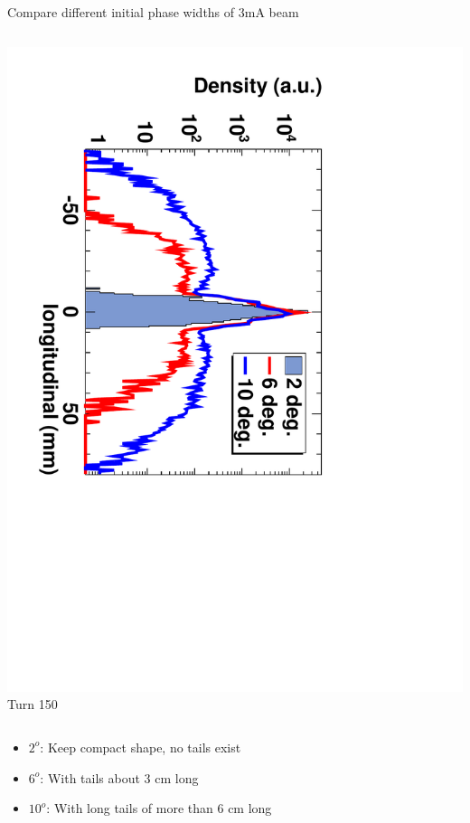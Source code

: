 \documentclass[xcolor=pdftex,table,10pt,yellow,mathserif]{beamer}
\begin{document}
{\begin{block}{Compare different initial phase widths of 3mA beam}
\begin{columns}
\begin{column}{3.0cm}
      \includegraphics[angle=90,width=\linewidth]{figures/Theta-Turn-150.pdf} \\
      \center Turn 150
    \end{column}
  \end{columns}
  \end{block}
  \begin{block}{}  
    \begin{itemize}
      \item $2^o$:  Keep compact shape, no tails exist
      \item $6^o$:  With tails about 3 cm long
      \item $10^o$: With long tails of more than 6 cm long
    \end{itemize}
  \end{block}

}
\end{document}
